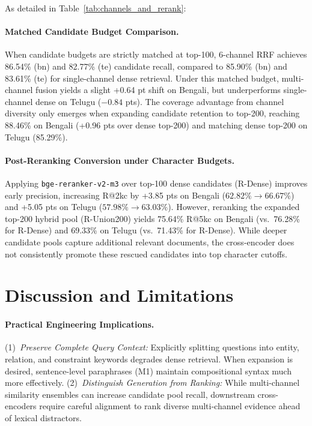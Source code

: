 \documentclass[11pt]{article}
\begin{document}
As detailed in Table~\ref{tab:channels_and_rerank}:

\paragraph{Matched Candidate Budget Comparison.} When candidate budgets are strictly matched at top-100, 6-channel RRF achieves 86.54\% (bn) and 82.77\% (te) candidate recall, compared to 85.90\% (bn) and 83.61\% (te) for single-channel dense retrieval. Under this matched budget, multi-channel fusion yields a slight +0.64 pt shift on Bengali, but underperforms single-channel dense on Telugu ($-0.84$ pts). The coverage advantage from channel diversity only emerges when expanding candidate retention to top-200, reaching 88.46\% on Bengali (+0.96 pts over dense top-200) and matching dense top-200 on Telugu (85.29\%).

\paragraph{Post-Reranking Conversion under Character Budgets.} Applying \texttt{bge-reranker-v2-m3} over top-100 dense candidates (R-Dense) improves early precision, increasing R@2kc by +3.85 pts on Bengali ($62.82\% \to 66.67\%$) and +5.05 pts on Telugu ($57.98\% \to 63.03\%$). However, reranking the expanded top-200 hybrid pool (R-Union200) yields 75.64\% R@5kc on Bengali (vs.\ 76.28\% for R-Dense) and 69.33\% on Telugu (vs.\ 71.43\% for R-Dense). While deeper candidate pools capture additional relevant documents, the cross-encoder does not consistently promote these rescued candidates into top character cutoffs.

\section{Discussion and Limitations}
\label{sec:discussion}

\paragraph{Practical Engineering Implications.} (1)~\emph{Preserve Complete Query Context:} Explicitly splitting questions into entity, relation, and constraint keywords degrades dense retrieval. When expansion is desired, sentence-level paraphrases (M1) maintain compositional syntax much more effectively. (2)~\emph{Distinguish Generation from Ranking:} While multi-channel similarity ensembles can increase candidate pool recall, downstream cross-encoders require careful alignment to rank diverse multi-channel evidence ahead of lexical distractors.
\end{document}
